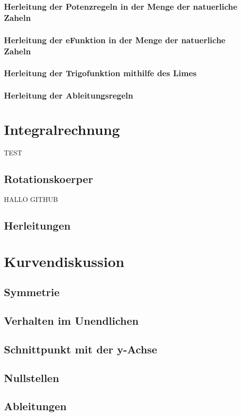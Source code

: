 \documentclass[a4paper]{article} %
\begin{document}
	\subsubsection{Herleitung der Potenzregeln in der Menge der natuerliche Zaheln}
	\subsubsection{Herleitung der eFunktion in der Menge der natuerliche Zaheln}
	\subsubsection{Herleitung der Trigofunktion mithilfe des Limes}
	\subsubsection{Herleitung der Ableitungsregeln}
	\section{Integralrechnung}
	TEST
	\subsection{Rotationskoerper}  
	HALLO GITHUB                                                       
	\subsection{Herleitungen}
	\section{Kurvendiskussion}
	\subsection{Symmetrie}
	\subsection{Verhalten im Unendlichen}
	\subsection{Schnittpunkt mit der y-Achse}
	\subsection{Nullstellen}
	\subsection{Ableitungen}
\end{document}

